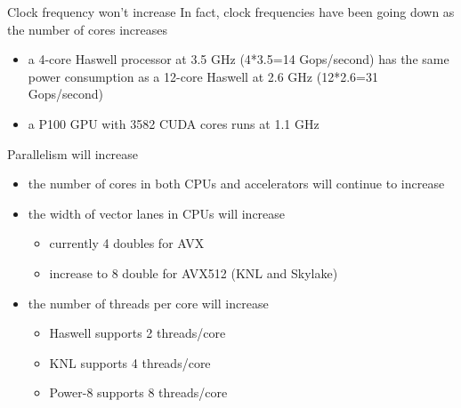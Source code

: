 \documentclass[aspectratio=43]{beamer}
\begin{document}
\begin{frame}[fragile]{}
    \begin{info}{Clock frequency won't increase}
        In fact, clock frequencies have been going down as the number of cores increases
        \begin{itemize}
            \item a 4-core Haswell processor at 3.5 GHz (4*3.5=14 Gops/second) has the same power consumption as a 12-core Haswell at 2.6 GHz (12*2.6=31 Gops/second)
            \item a P100 GPU with 3582 CUDA cores runs at 1.1 GHz
        \end{itemize}
    \end{info}
\end{frame}

\begin{frame}[fragile]{}
    \begin{info}{Parallelism will increase}
        \begin{itemize}
            \item the number of cores in both CPUs and accelerators will continue to increase
            \item the width of vector lanes in CPUs will increase
            \begin{itemize}
                \item currently 4 doubles for AVX
                \item increase to 8 double for AVX512 (KNL and Skylake)
            \end{itemize}
            \item the number of threads per core will increase
            \begin{itemize}
                \item Haswell supports 2 threads/core
                \item KNL supports 4 threads/core
                \item Power-8 supports 8 threads/core
            \end{itemize}
        \end{itemize}
    \end{info}
\end{frame}
\end{document}

